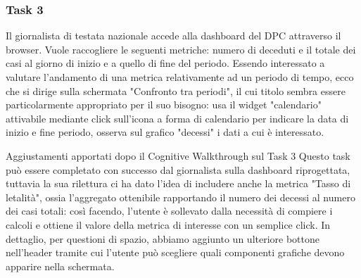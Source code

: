 \subsubsection{Task 3}
\label{sss:cw-task-3}

Il giornalista di testata nazionale accede alla dashboard del DPC attraverso il browser.
Vuole raccogliere le seguenti metriche: numero di deceduti e il totale dei casi al giorno di inizio e a quello di fine del periodo.
Essendo interessato a valutare l'andamento di una metrica relativamente ad un periodo di tempo, ecco che si dirige sulla schermata "Confronto tra periodi", il cui titolo sembra essere particolarmente appropriato per il suo bisogno: usa il widget "calendario" attivabile mediante click sull'icona a forma di calendario per indicare la data di inizio e fine periodo, osserva sul grafico "decessi" i dati a cui è interessato.

\begin{bclogo}{Aggiustamenti apportati dopo il Cognitive Walkthrough sul Task 3}
    Questo task può essere completato con successo dal giornalista sulla dashboard riprogettata, tuttavia la sua rilettura ci ha dato l'idea di includere anche la metrica "Tasso di letalità", ossia l'aggregato ottenibile rapportando il numero dei decessi al numero dei casi totali: così facendo, l'utente è sollevato dalla necessità di compiere i calcoli e ottiene il valore della metrica di interesse con un semplice click.
    In dettaglio, per questioni di spazio, abbiamo aggiunto un ulteriore bottone nell'header tramite cui l'utente può scegliere quali componenti grafiche devono apparire nella schermata.
\end{bclogo}